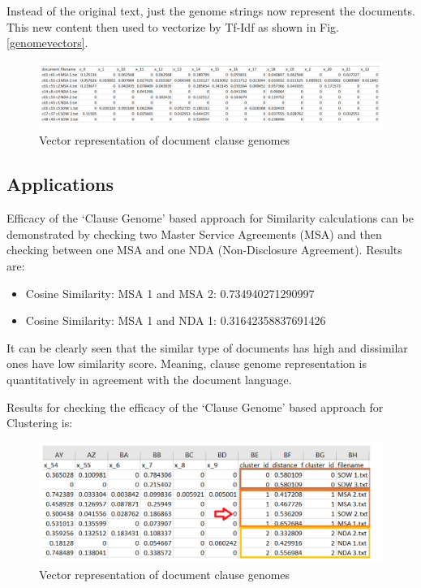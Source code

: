 \documentclass[9pt,academicons]{article}
\begin{document}
Instead of the original text, just the genome strings now represent the documents. This new content then used to vectorize by Tf-Idf as shown in Fig. \ref{genomevectors}.

 \begin{figure}[h!]
 \begin{center}
  \includegraphics[width=\linewidth]{img/genomevectors.png}
  \caption{Vector representation of document clause genomes}
  \label{fig:genomevectors}
 \end{center}
 \end{figure}


\subsection{Applications}
\label{subsec:application}

Efficacy of the `Clause Genome' based approach for Similarity calculations can be demonstrated by checking two Master Service Agreements (MSA) and then checking between one MSA and one NDA (Non-Disclosure Agreement). Results are:

 \begin{itemize}
 \item Cosine Similarity: MSA 1 and MSA 2: 0.734940271290997 
\item Cosine Similarity: MSA 1 and NDA 1: 0.31642358837691426 
\end{itemize}

It can be clearly seen that the similar type of documents has high and dissimilar ones have low similarity score. Meaning, clause genome
representation is quantitatively in agreement with the document language.

Results for checking the efficacy of the `Clause Genome' based approach for Clustering is:

 \begin{figure}[h!]
 \begin{center}
  \includegraphics[width=\linewidth]{img/genomeclustering.png}
  \caption{Vector representation of document clause genomes}
  \label{fig:genomeclustering}
 \end{center}
 \end{figure}
 
\end{document}
